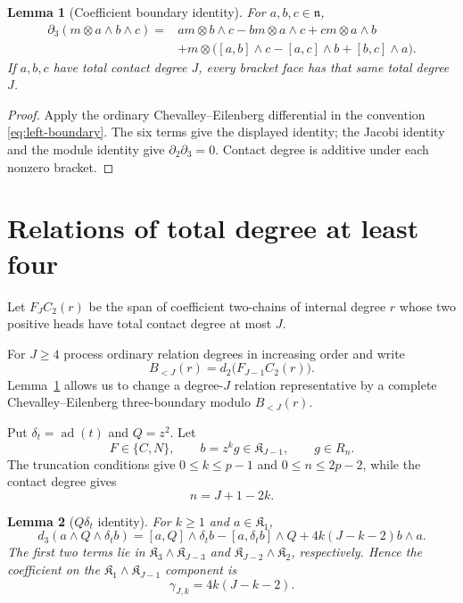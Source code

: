 \documentclass[11pt]{article}
\theoremstyle{plain}
\newtheorem{lemma}[lemma]{Lemma}
\theoremstyle{definition}
\theoremstyle{remark}
\numberwithin{equation}{section}
\newcommand{\Kalg}{\mathfrak K}
\begin{document}
\begin{lemma}[Coefficient boundary identity]\label{thm:triangularity}
For $a,b,c\in\mathfrak n$,
\begin{equation}\label{eq:coefficient-boundary-change}
\begin{aligned}
 \partial_3(m\otimes a\wedge b\wedge c)={}&
 am\otimes b\wedge c-bm\otimes a\wedge c+cm\otimes a\wedge b\\
 &+m\otimes\bigl([a,b]\wedge c-[a,c]\wedge b+[b,c]\wedge a\bigr).
\end{aligned}
\end{equation}
If $a,b,c$ have total contact degree $J$, every bracket face has
that same total degree $J$.
\end{lemma}
\begin{proof}
Apply the ordinary Chevalley--Eilenberg differential in the convention
\eqref{eq:left-boundary}. The six terms give the displayed identity;
the Jacobi identity and the module identity give $\partial_2\partial_3=0$.
Contact degree is additive under each nonzero bracket.
\end{proof}

\section{Relations of total degree at least four}\label{sec:higher}

Let $F_JC_2(r)$ be the span of coefficient two-chains of internal degree $r$
whose two positive heads have total contact degree at most $J$.

For $J\ge4$ process ordinary relation degrees in increasing order and write
\[
 B_{<J}(r)=d_2\bigl(F_{J-1}C_2(r)\bigr).
\]
Lemma~\ref{thm:triangularity} allows us to change a degree-$J$ relation representative
by a complete Chevalley--Eilenberg three-boundary modulo $B_{<J}(r)$.

Put $\delta_t=\operatorname{ad}(t)$ and $Q=z^2$.  Let
\[
 F\in\{C,N\},
 \qquad b=z^kg\in\Kalg_{J-1},
 \qquad g\in R_n.
\]
The truncation conditions give $0\le k\le p-1$ and $0\le n\le2p-2$, while the contact
degree gives
\begin{equation}\label{eq:nJk}
 n=J+1-2k.
\end{equation}

\begin{lemma}[$Q\delta_t$ identity]\label{lem:QD}
For $k\ge1$ and $a\in\Kalg_1$,
\begin{equation}\label{eq:QD}
 d_3(a\wedge Q\wedge\delta_tb)
 =[a,Q]\wedge\delta_tb-[a,\delta_tb]\wedge Q
 +4k(J-k-2)b\wedge a.
\end{equation}
The first two terms lie in
$\Kalg_3\wedge\Kalg_{J-3}$ and $\Kalg_{J-2}\wedge\Kalg_2$, respectively.  Hence the
coefficient on the $\Kalg_1\wedge\Kalg_{J-1}$ component is
\[
 \gamma_{J,k}=4k(J-k-2).
\]
\end{lemma}
\end{document}
